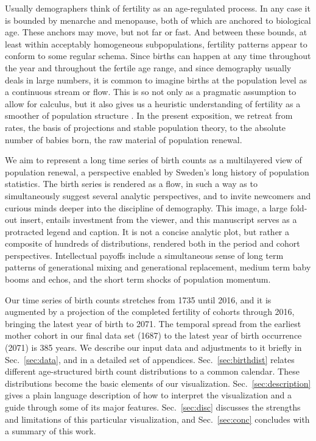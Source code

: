 Usually demographers think of fertility as an age-regulated process. In any case it is bounded by menarche and menopause, both of which are anchored to biological age. These anchors may move, but not far or fast. And between these bounds, at least within acceptably homogeneous subpopulations, fertility patterns appear to conform to some regular schema. Since births can happen at any time throughout the year and throughout the fertile age range, and since demography usually deals in large numbers, it is common to imagine births at the population level as a continuous stream or flow. This is so not only as a pragmatic assumption to allow for calculus, but it also gives us a heuristic understanding of fertility as a smoother of population structure \citep{arthur1982ergodic}. In the present exposition, we retreat from rates, the basis of projections and stable population theory, to the absolute number of babies born, the raw material of population renewal. 

We aim to represent a long time series of birth counts as a multilayered view of population renewal, a perspective enabled by Sweden's long history of population statistics. The birth series is rendered as a flow, in such a way as to simultaneously suggest several analytic perspectives, and to invite newcomers and curious minds deeper into the discipline of demography. This image, a large fold-out insert, entails investment from the viewer, and this manuscript serves as a protracted legend and caption. It is not a concise analytic plot, but rather a composite of hundreds of distributions, rendered both in the period and cohort perspectives. Intellectual payoffs include a simultaneous sense of long term patterns of generational mixing and generational replacement, medium term baby booms and echos, and the short term shocks of population momentum. %

Our time series of birth counts stretches from 1735 until 2016, and it is augmented by a projection of the completed fertility of cohorts through 2016, bringing the latest year of birth to 2071. The temporal spread from the earliest mother cohort in our final data set (1687) to the latest year of birth occurrence (2071) is 385 years. We describe our input data and adjustments to it briefly in Sec.~\ref{sec:data}, and in a detailed set of appendices. Sec.~\ref{sec:birthdist} relates different age-structured birth count distributions to a common calendar. These distributions become the basic elements of our visualization. Sec.~\ref{sec:description} gives a plain language description of how to interpret the visualization and a guide through some of its major features. Sec.~\ref{sec:disc} discusses the strengths and limitations of this particular visualization, and Sec.~\ref{sec:conc} concludes with a summary of this work.

